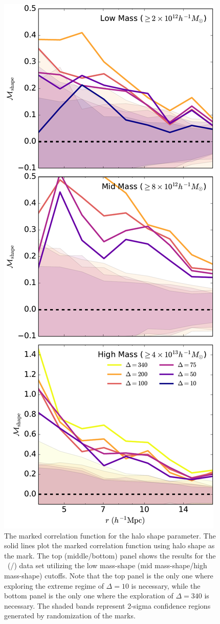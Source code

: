 \documentclass[usenatbib]{mnras}
\begin{document}
\begin{figure}
	\centering
	\includegraphics[width=.4\textwidth]{all_mcf_shape.pdf}
	\caption{
	The marked correlation function for the halo shape parameter. The solid lines plot the marked correlation function using halo shape as the mark. The top (middle/bottom) panel shows the results for the
\simA \ (\simB /\simC) data set utilizing the low mass-shape (mid mass-shape/high mass-shape) cutoffs. Note
that the top panel is the only one where exploring the extreme regime of $\Delta = 10$ is
necessary, while the bottom panel is the only one where the exploration of $\Delta = 340$
is necessary. The shaded bands represent 2-sigma confidence regions generated by randomization of the marks.}
	\label{fig:cc_mcf_s}
\end{figure}
\end{document}
